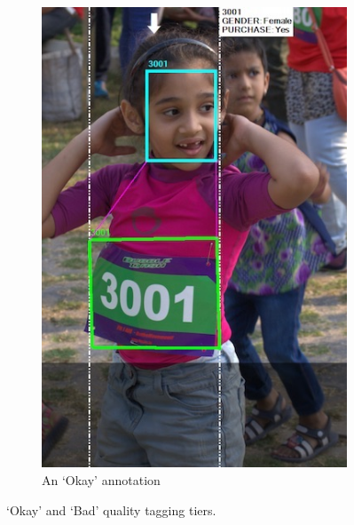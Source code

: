 \begin{figure}[p]
\begin{subfigure}[b]{0.30\textwidth}
    \includegraphics[width=\textwidth]{images/dataset/argus/quality_tagging_okay}
    \caption{An `Okay' annotation}
      \label{fig:dataset:argus:qualituy_tiers:okay}
  \end{subfigure}
  \hspace{\fill}
  \caption[Quality assurance using Argus]{`Okay' and `Bad' quality tagging tiers.}
  \label{fig:dataset:argus:qualituy_tiers}
\end{figure}

